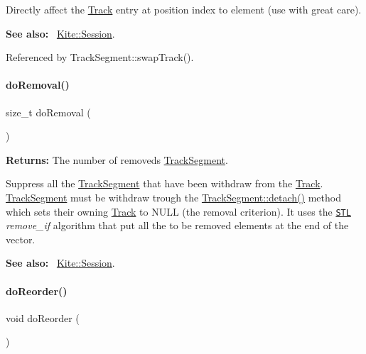 Directly affect the \hyperlink{classKite_1_1Track}{Track} entry at position {\ttfamily index} to {\ttfamily element} (use with great care).

{\bfseries See also\+:}~ \hyperlink{classKite_1_1Session}{Kite\+::\+Session}. 

Referenced by Track\+Segment\+::swap\+Track().

\mbox{\label{classKite_1_1Track_abfffcd781865b94f62f27a1e7be99a38}} 
\paragraph{\texorpdfstring{do\+Removal()}{doRemoval()}}
{\footnotesize\ttfamily size\+\_\+t do\+Removal (\begin{DoxyParamCaption}{ }\end{DoxyParamCaption})}

{\bfseries Returns\+:} The number of removeds \hyperlink{classKite_1_1TrackSegment}{Track\+Segment}.

Suppress all the \hyperlink{classKite_1_1TrackSegment}{Track\+Segment} that have been withdraw from the \hyperlink{classKite_1_1Track}{Track}. \hyperlink{classKite_1_1TrackSegment}{Track\+Segment} must be withdraw trough the \hyperlink{classKite_1_1TrackSegment_ac295bade8aee589f6718dfa79edc2a34}{Track\+Segment\+::detach()} method which sets their owning \hyperlink{classKite_1_1Track}{Track} to {\ttfamily N\+U\+LL} (the removal criterion). It uses the \href{http://www.sgi.com/tech/stl/}{\tt S\+TL} {\itshape remove\+\_\+if} algorithm that put all the to be removed elements at the end of the vector.

{\bfseries See also\+:}~ \hyperlink{classKite_1_1Session}{Kite\+::\+Session}. \mbox{\label{classKite_1_1Track_aaccb9224f5b38ecd8506fd1eec9ef5ca}} 
\paragraph{\texorpdfstring{do\+Reorder()}{doReorder()}}
{\footnotesize\ttfamily void do\+Reorder (\begin{DoxyParamCaption}{ }\end{DoxyParamCaption})}

